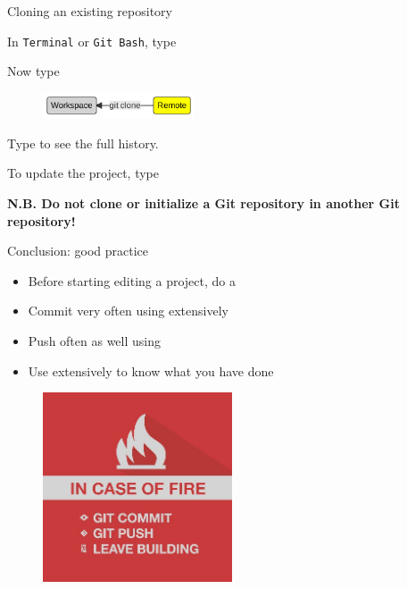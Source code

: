 \documentclass[10pt]{beamer}
\begin{document}
\begin{frame}[fragile]{Cloning an existing repository}
\protect\hypertarget{cloning-an-existing-repository}{}

In \texttt{Terminal} or \texttt{Git\ Bash}, type 

Now type 

\begin{figure}[H]

{\centering \includegraphics[width=0.4\textwidth]{mermaid/mermaid-figure-10.png}

}

\end{figure}

Type  to see the full history.

To update the project, type 

\textbf{N.B. Do not clone or initialize a Git repository in another Git
repository!}

\end{frame}

\begin{frame}[fragile]{Conclusion: good practice}
\protect\hypertarget{conclusion-good-practice}{}
\begin{itemize}
\item
  Before starting editing a project, do a 
\item
  Commit very often using  extensively
\item
  Push often as well using 
\item
  Use  extensively to know what you have done
\end{itemize}

\begin{figure}

{\centering \includegraphics[width=0.5\textwidth]{img/funny.jpg}

}

\end{figure}
\end{frame}
\end{document}
